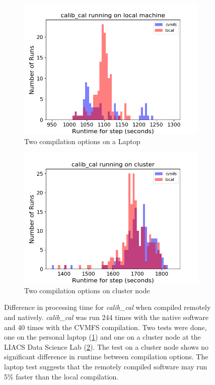 \begin{figure}
  \centering
     \begin{subfigure}{.45\linewidth}
    \includegraphics[width=\linewidth]{ch4/figures/ppr2_calib_local.png}
    \caption{Two compilation options on a Laptop}
	\label{fig:ch4_cmvfs1_calib}
    \end{subfigure}%
    \begin{subfigure}{.45\linewidth}
     \includegraphics[width=\linewidth]{ch4/figures/ppr2_calib_cluster.png}
    \caption{Two compilation options on cluster node}
	\label{fig:ch4_cmvfs2_calib}
    \end{subfigure}%
      \caption[Speed comparison between natively and remotely compiled software for the 'calib\_cal' step.]{Difference in processing time for \textit{calib\_cal} when compiled remotely and natively. \textit{calib\_cal} was run 244 times with the native software and 40 times with the CVMFS compilation. Two tests were done, one on the personal laptop (\ref{fig:ch4_cmvfs1_calib}) and one on a cluster node at the LIACS Data Science Lab (\ref{fig:ch4_cmvfs2_calib}). The test on a cluster node shows no significant difference in runtime between compilation options. The laptop test suggests that the remotely compiled software may run 5\% faster than the local compilation. } 
	\label{fig:ch4_cvmfs_native}
\end{figure}


